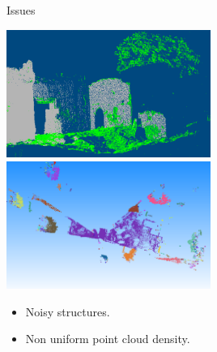 \documentclass{beamer}
\begin{document}
\begin{frame}{Issues}

\includegraphics[width=0.50\textwidth]{pics/vrmesh-veg.png}
\includegraphics[width=0.50\textwidth]{pics/clustering.png}

\begin{itemize}
\item Noisy structures.
\item Non uniform point cloud density.
\end{itemize}


\end{frame}
\end{document}
